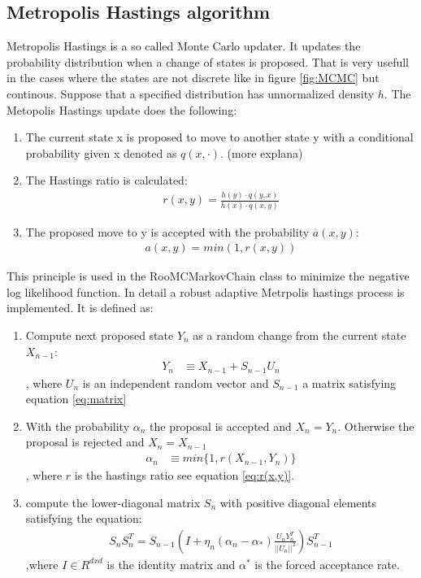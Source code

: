 \documentclass[english]{uzhpub}
\begin{document}
\subsection{Metropolis Hastings algorithm}

Metropolis Hastings is a so called Monte Carlo updater. It updates the probability distribution when a change of states is proposed. That is very usefull in the cases where the states are not discrete like in figure \ref{fig:MCMC} but continous. Suppose that a specified distribution has unnormalized density $h$. The Metopolis Hastings update does the following:
\begin{enumerate}
  \item The current state x is proposed to move to another state y with a conditional probability given x denoted as $q(x,\cdot)$. (more explana)
  \item The Hastings ratio is calculated:
  \begin{align}
    r(x,y) = \frac{h(y) \cdot q(y,x)}{h(x) \cdot q(x,y)} \label{eq:r(x,y)}
  \end{align}
  \item The proposed move to y is accepted with the probability $a(x,y)$:
  \begin{align}
    a(x,y) = min(1,r(x,y))
  \end{align}
\end{enumerate}

This principle is used in the RooMCMarkovChain class to minimize the negative log likelihood function. In detail a robust adaptive Metrpolis hastings process is implemented. It is defined as:
\begin{enumerate}
  \item  Compute next proposed state $Y_n$ as a random change from the current state $X_{n-1}$:
  \begin{align*}   Y_n &\equiv X_{n-1} + S_{n-1} U_n    \end{align*}
  , where $U_n$ is an independent random vector and $S_{n-1}$ a matrix satisfying equation \ref{eq:matrix}
  \item With the probability $\alpha_n$ the proposal is accepted and $X_n = Y_n$. Otherwise the proposal is rejected and $X_n = X_{n-1}$
  \begin{align*}  \alpha_n &\equiv min\{ 1, r(X_{n-1},Y_n) \} \end{align*}
  , where $r$ is the hastings ratio see equation \ref{eq:r(x,y)}.
  \item compute the lower-diagonal matrix $S_n$ with positive diagonal elements satisfying the equation:
  \begin{align}
    S_n S_n^T = S_{n-1} \left( I + \eta_n(\alpha_n - \alpha_*) \frac{U_n Y_n^T}{||U_n||^2} \right) S_{n-1}^T \label{eq:matrix}
  \end{align}
  ,where $I \in R^{dxd}$ is the identity matrix and $\alpha^*$ is the forced acceptance rate.
\end{enumerate}
\end{document}
